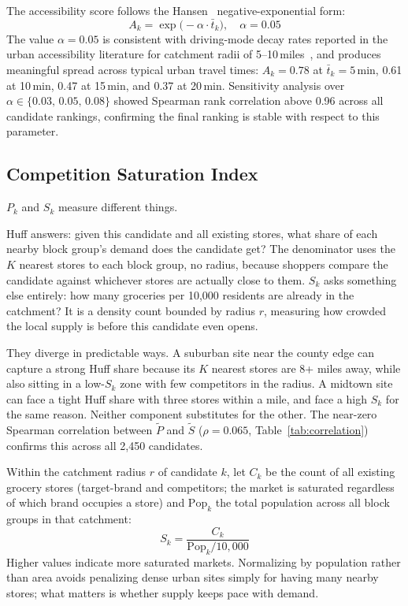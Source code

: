 \documentclass[conference]{IEEEtran}
\begin{document}
The accessibility score follows the Hansen~\cite{Hansen1959}
negative-exponential form:
\begin{equation}
A_k = \exp\!\bigl(-\alpha \cdot \bar{t}_k\bigr), \quad \alpha = 0.05
\label{eq:access}
\end{equation}
The value $\alpha = 0.05$ is consistent with driving-mode decay rates
reported in the urban accessibility literature for catchment radii of
5--10\,miles~\cite{Luo2003,Wang2012}, and produces meaningful spread
across typical urban travel times: $A_k = 0.78$ at $\bar{t}_k =
5$\,min, 0.61 at 10\,min, 0.47 at 15\,min, and 0.37 at 20\,min.
Sensitivity analysis over $\alpha \in \{0.03,\,0.05,\,0.08\}$
showed Spearman rank correlation above 0.96 across all candidate
rankings, confirming the final ranking is stable with respect to
this parameter.

\subsection{Competition Saturation Index}

$P_k$ and $S_k$ measure different things.

Huff answers: given this candidate and all existing stores, what share
of each nearby block group's demand does the candidate get? The
denominator uses the $K$ nearest stores to each block group, no
radius, because shoppers compare the candidate against whichever stores
are actually close to them. $S_k$ asks something else entirely: how
many groceries per 10{,}000 residents are already in the catchment?
It is a density count bounded by radius $r$, measuring how crowded the
local supply is before this candidate even opens.

They diverge in predictable ways. A suburban site near the county edge
can capture a strong Huff share because its $K$ nearest stores are
8+ miles away, while also sitting in a low-$S_k$ zone with few
competitors in the radius. A midtown site can face a tight Huff share
with three stores within a mile, and face a high $S_k$ for the same
reason. Neither component substitutes for the other. The near-zero
Spearman correlation between $\widetilde{P}$ and $\widetilde{S}$
($\rho = 0.065$, Table~\ref{tab:correlation}) confirms this across
all 2{,}450 candidates.

Within the catchment radius $r$ of candidate $k$, let $C_k$ be the
count of all existing grocery stores (target-brand and competitors;
the market is saturated regardless of which brand occupies a store)
and $\text{Pop}_k$ the total population across all block groups in
that catchment:
\begin{equation}
S_k = \frac{C_k}{\text{Pop}_k / 10{,}000}
\label{eq:competition}
\end{equation}
Higher values indicate more saturated markets. Normalizing by
population rather than area avoids penalizing dense urban sites
simply for having many nearby stores; what matters is whether supply
keeps pace with demand.
\end{document}
